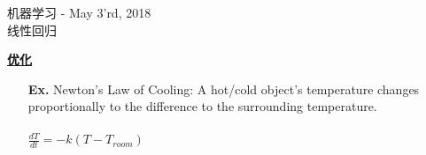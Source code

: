 \documentclass{letter}
\newcommand{\0}[1]{\begin{bmatrix}#1\end{bmatrix}}
\newcommand{\h}[1]{\underline{\textbf{#1}}}
\begin{document}
    \begin{center}
        \LARGE 机器学习 - May 3'rd, 2018\\
        \large 线性回归
    \end{center}
    \vspace{0.25 in}
    
    \h{优化}
    \begin{itemize}
		\item[\textbf{Ex. }] Newton's Law of Cooling: A hot/cold object's temperature changes proportionally to the difference to the surrounding temperature.\\\\
		$\frac{dT}{dt} = -k(T-T_{room})$
	\end{itemize}
    
\end{document}

